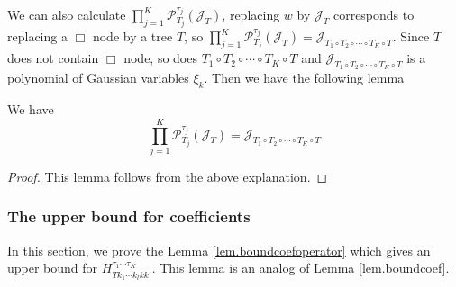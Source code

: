 We can also calculate $\prod_{j=1}^K\mathcal{P}^{\tau_j}_{T_j}(\mathcal{J}_{T})$, replacing $w$ by $\mathcal{J}_{T}$ corresponds to replacing a $\Box$ node by a tree $T$, so $\prod_{j=1}^K\mathcal{P}^{\tau_j}_{T_j}(\mathcal{J}_{T})=\mathcal{J}_{T_1\circ T_2\circ \cdots\circ T_K\circ T}$. Since $T$ does not contain $\Box$ node, so does $T_1\circ T_2\circ \cdots\circ T_K\circ T$ and $\mathcal{J}_{T_1\circ T_2\circ \cdots\circ T_K\circ T}$ is a polynomial of Gaussian variables $\xi_k$. Then we have the following lemma
\begin{lem}
We have 
\begin{equation}\label{eq.operatoreqsimpleJ_T.threewave}
    \prod_{j=1}^K\mathcal{P}^{\tau_j}_{T_j}(\mathcal{J}_{T})=\mathcal{J}_{T_1\circ T_2\circ \cdots\circ T_K\circ T}
\end{equation}
\end{lem}
\begin{proof}
This lemma follows from the above explanation.
\end{proof}



\subsubsection{The upper bound for coefficients} In this section, we prove the Lemma \ref{lem.boundcoefoperator} which gives an upper bound for $H^{\tau_1\cdots \tau_{K}}_{Tk_1\cdots k_{l}kk'}$. This lemma is an analog of Lemma \ref{lem.boundcoef}.

